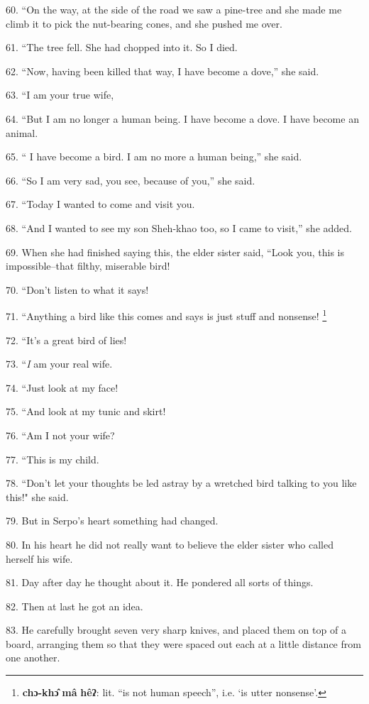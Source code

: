 60. ``On the way, at the side of the road we saw a pine-tree and she made
me climb it to pick the nut-bearing cones, and she pushed me over.

61. ``The tree fell. She had chopped into it. So I died.

62. ``Now, having been killed that way, I have become a dove,''
she said.

63. ``I am your true wife,

64. ``But I am no longer a human being. I have become a dove. I have become
an animal.

65. `` I have become a bird. I am no more a human being,'' she
said.

66. ``So I am very sad, you see, because of you,'' she said.

67. ``Today I wanted to come and visit you.

68. ``And I wanted to see my son Sheh-khao too, so I came to visit,''
she added.

69. When she had finished saying this, the elder sister said, ``Look you,
this is impossible--that filthy, miserable bird!

70. ``Don't listen to what it says!

71. ``Anything a bird like this comes and says is just stuff and nonsense!
\footnote{\textbf{chɔ-khɔ̂} \textbf{mâ} \textbf{hêʔ}: lit. ``is not human speech'', i.e. `is utter nonsense'.}

72. ``It's a great bird of lies!

73. ``\textit{I} am your real wife.

74. ``Just look at my face!

75. ``And look at my tunic and skirt!

76. ``Am I not your wife?

77. ``This is my child.

78. ``Don't let your thoughts be led astray by a wretched bird talking
to you like this!" she said.

79. But in Serpo's heart something had changed.

80. In his heart he did not really want to believe the elder sister who called
herself his wife.

81. Day after day he thought about it. He pondered all sorts of things.

82. Then at last he got an idea.

83. He carefully brought seven very sharp knives, and placed them on top of a board,
arranging them so that they were spaced out each at a little distance from one
another.

